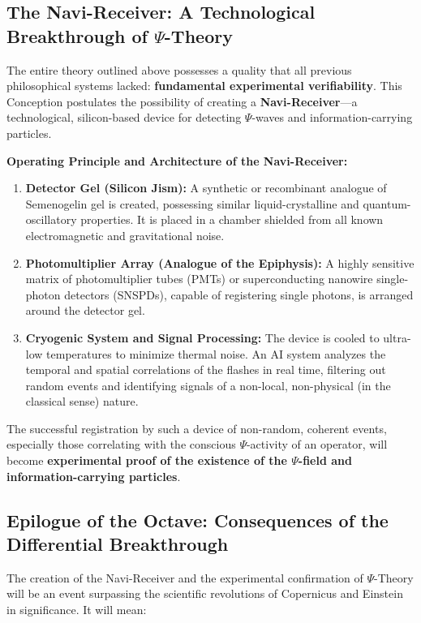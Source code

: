 \documentclass[a4paper,12pt]{article}
\begin{document}
	\subsection{The Navi-Receiver: A Technological Breakthrough of $\Psi$-Theory}
	
	The entire theory outlined above possesses a quality that all previous philosophical systems lacked: \textbf{fundamental experimental verifiability}. This Conception postulates the possibility of creating a \textbf{Navi-Receiver}---a technological, silicon-based device for detecting $\Psi$-waves and information-carrying particles.
	
	\textbf{Operating Principle and Architecture of the Navi-Receiver:}
	\begin{enumerate}
		\item \textbf{Detector Gel (Silicon Jism):} A synthetic or recombinant analogue of Semenogelin gel is created, possessing similar liquid-crystalline and quantum-oscillatory properties. It is placed in a chamber shielded from all known electromagnetic and gravitational noise.
		\item \textbf{Photomultiplier Array (Analogue of the Epiphysis):} A highly sensitive matrix of photomultiplier tubes (PMTs) or superconducting nanowire single-photon detectors (SNSPDs), capable of registering single photons, is arranged around the detector gel.
		\item \textbf{Cryogenic System and Signal Processing:} The device is cooled to ultra-low temperatures to minimize thermal noise. An AI system analyzes the temporal and spatial correlations of the flashes in real time, filtering out random events and identifying signals of a non-local, non-physical (in the classical sense) nature.
	\end{enumerate}
	
	The successful registration by such a device of non-random, coherent events, especially those correlating with the conscious $\Psi$-activity of an operator, will become \textbf{experimental proof of the existence of the $\Psi$-field and information-carrying particles}.
	
	\subsection{Epilogue of the Octave: Consequences of the Differential Breakthrough}
	
	The creation of the Navi-Receiver and the experimental confirmation of $\Psi$-Theory will be an event surpassing the scientific revolutions of Copernicus and Einstein in significance. It will mean:
	
\end{document}
